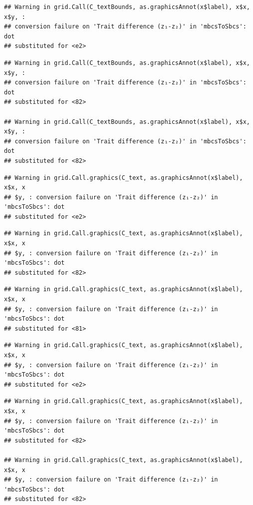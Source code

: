 \documentclass[]{article}
\begin{document}
\begin{verbatim}
## Warning in grid.Call(C_textBounds, as.graphicsAnnot(x$label), x$x, x$y, :
## conversion failure on 'Trait difference (z₁-z₂)' in 'mbcsToSbcs': dot
## substituted for <e2>
\end{verbatim}

\begin{verbatim}
## Warning in grid.Call(C_textBounds, as.graphicsAnnot(x$label), x$x, x$y, :
## conversion failure on 'Trait difference (z₁-z₂)' in 'mbcsToSbcs': dot
## substituted for <82>

## Warning in grid.Call(C_textBounds, as.graphicsAnnot(x$label), x$x, x$y, :
## conversion failure on 'Trait difference (z₁-z₂)' in 'mbcsToSbcs': dot
## substituted for <82>
\end{verbatim}

\begin{verbatim}
## Warning in grid.Call.graphics(C_text, as.graphicsAnnot(x$label), x$x, x
## $y, : conversion failure on 'Trait difference (z₁-z₂)' in 'mbcsToSbcs': dot
## substituted for <e2>
\end{verbatim}

\begin{verbatim}
## Warning in grid.Call.graphics(C_text, as.graphicsAnnot(x$label), x$x, x
## $y, : conversion failure on 'Trait difference (z₁-z₂)' in 'mbcsToSbcs': dot
## substituted for <82>
\end{verbatim}

\begin{verbatim}
## Warning in grid.Call.graphics(C_text, as.graphicsAnnot(x$label), x$x, x
## $y, : conversion failure on 'Trait difference (z₁-z₂)' in 'mbcsToSbcs': dot
## substituted for <81>
\end{verbatim}

\begin{verbatim}
## Warning in grid.Call.graphics(C_text, as.graphicsAnnot(x$label), x$x, x
## $y, : conversion failure on 'Trait difference (z₁-z₂)' in 'mbcsToSbcs': dot
## substituted for <e2>
\end{verbatim}

\begin{verbatim}
## Warning in grid.Call.graphics(C_text, as.graphicsAnnot(x$label), x$x, x
## $y, : conversion failure on 'Trait difference (z₁-z₂)' in 'mbcsToSbcs': dot
## substituted for <82>

## Warning in grid.Call.graphics(C_text, as.graphicsAnnot(x$label), x$x, x
## $y, : conversion failure on 'Trait difference (z₁-z₂)' in 'mbcsToSbcs': dot
## substituted for <82>
\end{verbatim}
\end{document}
